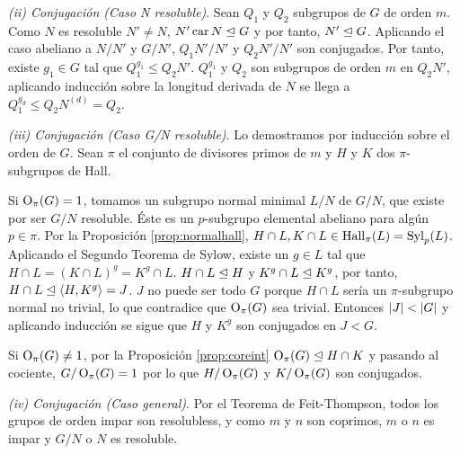 \begin{teorema}
\begin{demostracion}
		\textit{(ii) Conjugación (Caso N resoluble)}. Sean $Q_1$ y $Q_2$ subgrupos de $G$ de orden $m$. Como $N$ es resoluble $N'\neq N$, $N'\operatorname{car} N\trianglelefteq G$ y por tanto, $N'\trianglelefteq G$. Aplicando el caso abeliano a $N/N'$ y $G/N'$, $Q_1N'/N'$ y $Q_2N'/N'$ son conjugados. Por tanto, existe $g_1\in G$ tal que $Q_1^{g_1} \leq Q_2 N'$. %
		$Q_1^{g_1}$ y $Q_2$ son subgrupos de orden $m$ en $Q_2N'$, aplicando inducción sobre la longitud derivada de $N$ se llega a $Q_1^{g_d}\leq Q_2N^{(d)} = Q_2$.
		
		\textit{(iii) Conjugación (Caso G/N resoluble)}. 
		Lo demostramos por inducción sobre el orden de $G$. Sean $\pi$ el conjunto de divisores primos de $m$ y $H$ y $K$ dos $\pi$-subgrupos de Hall. 
		
		Si $\operatorname{O}_\pi(G)=1$, tomamos un subgrupo normal minimal $L/N$ de $G/N$, que existe por ser $G/N$ resoluble. 
		Éste es un $p$-subgrupo elemental abeliano para algún $p\in\pi$. Por la Proposición \ref{prop:normalhall}, $H\cap L,K\cap L \in \operatorname{Hall}_\pi(L) = \operatorname{Syl}_p(L)$. Aplicando el Segundo Teorema de Sylow, existe un $g\in L$ tal que $H\cap L = (K\cap L)^g = K^g\cap L$. $H\cap L\trianglelefteq H$ y $K^g\cap L\trianglelefteq K^g$, por tanto, $H\cap L \trianglelefteq \left\langle H,K^g\right\rangle = J$. $J$ no puede ser todo $G$ porque $H\cap L$ sería un $\pi$-subgrupo normal no trivial, lo que contradice que $\operatorname{O}_\pi(G)$ sea trivial. Entonces $\left|J\right| < \left|G\right|$ y aplicando inducción se sigue que $H$ y $K^g$ son conjugados en $J < G$.
		
		Si $\operatorname{O}_\pi(G)\neq 1$, por la Proposición \ref{prop:coreint} $\operatorname{O}_\pi(G) \trianglelefteq H\cap K$ y pasando al cociente, $G/\operatorname{O}_\pi(G) = 1$ por lo que $H/\operatorname{O}_\pi(G)$ y $K/\operatorname{O}_\pi(G)$ son conjugados.
		
		\textit{(iv) Conjugación (Caso general)}. Por el Teorema de Feit-Thompson, todos los grupos de orden impar son resolubless, y como $m$ y $n$ son coprimos, $m$ o $n$ es impar y $G/N$ o $N$ es resoluble.
	\end{demostracion}
\end{teorema}

